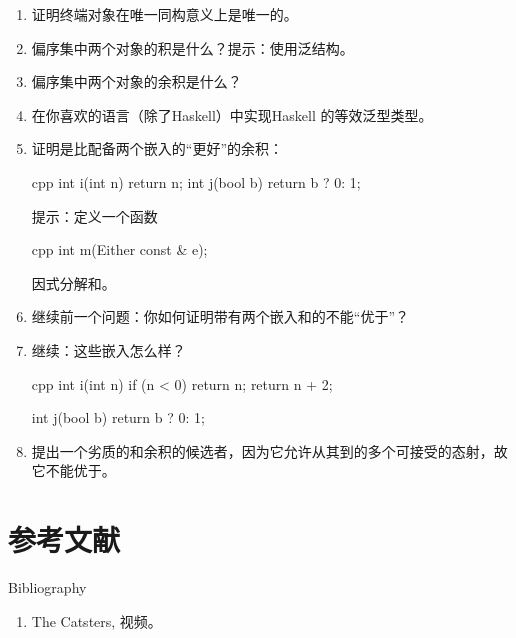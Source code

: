 \begin{enumerate}
  \tightlist
  \item
  证明终端对象在唯一同构意义上是唯一的。
  \item
  偏序集中两个对象的积是什么？提示：使用泛结构。
  \item
  偏序集中两个对象的余积是什么？
  \item
  在你喜欢的语言（除了Haskell）中实现Haskell 的等效泛型类型。
  \item
  证明是比配备两个嵌入的“更好”的余积：

  \begin{snip}{cpp}
    int i(int n) { return n; }
    int j(bool b) { return b ? 0: 1; }
  \end{snip}

  提示：定义一个函数

  \begin{snip}{cpp}
    int m(Either const & e);
  \end{snip}

  因式分解和。
  \item
  继续前一个问题：你如何证明带有两个嵌入和的不能“优于”？
  \item
  继续：这些嵌入怎么样？

  \begin{snip}{cpp}
    int i(int n) {
      if (n < 0) return n;
      return n + 2;
    }

    int j(bool b) { return b ? 0: 1; }
  \end{snip}
  \item
  提出一个劣质的和余积的候选者，因为它允许从其到的多个可接受的态射，故它不能优于。
\end{enumerate}

\section{参考文献}{Bibliography}

\begin{enumerate}
  \tightlist
  \item
  The Catsters,
   视频。
\end{enumerate}
